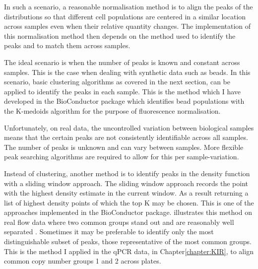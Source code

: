 In such a scenario, a reasonable normalisation method is to align the peaks of the distributions so that different cell populations are centered
in a similar location across samples even when their relative quantity changes.
The implementation of this normalisation method then depends on the method used to identify the peaks and to match them across samples.

The ideal scenario is when the number of peaks is known and constant across samples.
This is the case when dealing with synthetic data such as beads.
In this scenario, basic clustering algorithms as covered in the next section, can be applied to identify the peaks in each sample.
This is the method which I have developed in the  BioConductor package which identifies bead populations with the K-medoids algorithm
for the purpose of fluorescence normalisation.

Unfortunately, on real data, the uncontrolled variation between biological samples means that the certain peaks are not consistently identifiable across all samples.
The number of peaks is unknown and can vary between samples. 
More flexible peak searching algorithms are required to allow for this per sample-variation.

Instead of clustering, another method is to identify peaks in the density function with a sliding window approach.
The sliding window approach records the point with the highest density estimate in the current window.
As a result returning a list of highest density points of which the top K may be chosen.
This is one of the approaches implemented in the  BioConductor package.
 illustrates this method on real flow data where two common groups stand out and are reasonably well separated .
Sometimes it may be preferable to identify only the most distinguishable subset of peaks, those representative of the most common groups.
This is the method I applied in the qPCR data, in Chapter\ref{chapter:KIR}, to align common copy number groups 1 and 2 across plates.


